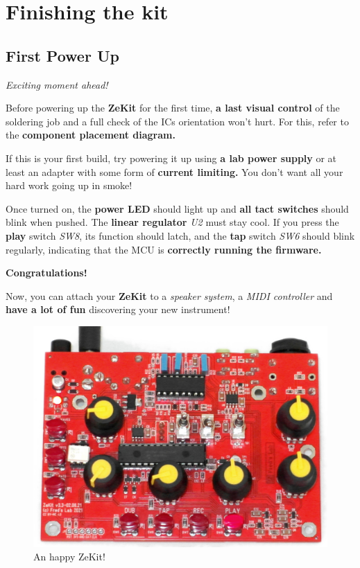 \documentclass{scrartcl}
\begin{document}
\pagebreak
\section{Finishing the kit}

\subsection{First Power Up}
\Large
\emph{Exciting moment ahead!}
\normalsize

Before powering up the \textbf{ZeKit} for the first time, \textbf{a last visual control} of the soldering job and a full check of the ICs orientation won't hurt.
For this, refer to the \textbf{component placement diagram.}

If this is your first build, try powering it up using \textbf{a lab power supply} or at least an adapter with some form of \textbf{current limiting.}
You don't want all your hard work going up in smoke!

Once turned on, the \textbf{power LED} should light up and \textbf{all tact switches} should blink when pushed. The \textbf{linear regulator} \emph{U2} must stay cool.
If you press the \textbf{play} switch \emph{SW8}, its function should latch, and the \textbf{tap} switch \emph{SW6} should blink regularly, indicating that the MCU is \textbf{correctly running the firmware.}

\vspace{0.5cm}
\textbf{Congratulations!}

Now, you can attach your \textbf{ZeKit} to a \emph{speaker system}, a \emph{MIDI controller} and \textbf{have a lot of fun} discovering your new instrument!

\begin{figure}[!ht]
    \begin{center}
        \includegraphics[scale=0.28]{assets/zekit-happy.jpg}
        \caption{An happy ZeKit!}
    \end{center}
\end{figure}
\end{document}
